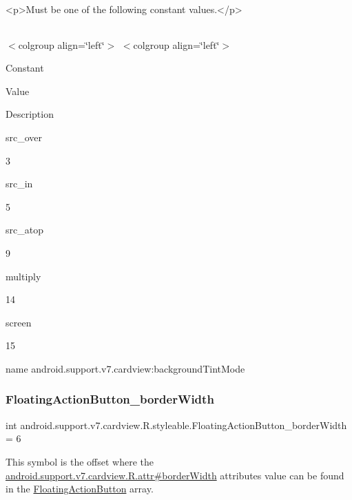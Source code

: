 \begin{DoxyVerb}      <p>Must be one of the following constant values.</p>
\end{DoxyVerb}
 \tabulinesep=1mm
\begin{longtabu} spread 0pt [c]{*{0}{|X[-1]}|}
\hline
\end{longtabu}
$<$colgroup align=\char`\"{}left\char`\"{}$>$ $<$colgroup align=\char`\"{}left\char`\"{}$>$ 

Constant

Value

Description 

{\ttfamily src\+\_\+over}

3

{\ttfamily src\+\_\+in}

5

{\ttfamily src\+\_\+atop}

9

{\ttfamily multiply}

14

{\ttfamily screen}

15

name android.\+support.\+v7.\+cardview\+:background\+Tint\+Mode \mbox{\label{classandroid_1_1support_1_1v7_1_1cardview_1_1R_1_1styleable_a6ade0c9a91640786d052b5ce9007367a}} 
\subsubsection{\texorpdfstring{Floating\+Action\+Button\+\_\+border\+Width}{FloatingActionButton\_borderWidth}}
{\footnotesize\ttfamily int android.\+support.\+v7.\+cardview.\+R.\+styleable.\+Floating\+Action\+Button\+\_\+border\+Width = 6\hspace{0.3cm}{\ttfamily [static]}}

This symbol is the offset where the \hyperlink{classandroid_1_1support_1_1v7_1_1cardview_1_1R_1_1attr_abd8bb035dd15229b04ee77ac0ab202d1}{android.\+support.\+v7.\+cardview.\+R.\+attr\#border\+Width} attribute\textquotesingle{}s value can be found in the \hyperlink{classandroid_1_1support_1_1v7_1_1cardview_1_1R_1_1styleable_a1be8c9bcabd399162362befcccf73f59}{Floating\+Action\+Button} array.

